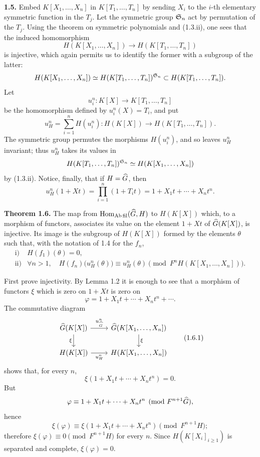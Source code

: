 \documentclass[11pt]{article}
\begin{document}
\textbf{1.5.} Embed \(K[X_1,\ldots,X_n]\) in \(K[T_1,\ldots,T_n]\) by sending \(X_i\) to the \(i\)-th elementary symmetric function in the \(T_j\). Let the symmetric group \(\mathfrak S_n\) act by permutation of the \(T_j\). Using the theorem on symmetric polynomials and (1.3.ii), one sees that the induced homomorphism
\[
  H(K[X_1,\ldots,X_n])\longrightarrow H(K[T_1,\ldots,T_n])
\]
is injective, which again permits us to identify the former with a subgroup of the latter:
\[
  H(K[X_1,\ldots,X_n])\simeq H(K[T_1,\ldots,T_n])^{\mathfrak S_n}
  \subset H(K[T_1,\ldots,T_n]).
\]
Let
\[
  u_i^n:K[X]\longrightarrow K[T_1,\ldots,T_n]
\]
be the homomorphism defined by \(u_i^n(X)=T_i\), and put
\[
  u_H^n=\sum_{i=1}^n H(u_i^n):H(K[X])\longrightarrow H(K[T_1,\ldots,T_n]).
\]
The symmetric group permutes the morphisms \(H(u_i^n)\), and so leaves \(u_H^n\) invariant; thus \(u_H^n\) takes its values in
\[
  H(K[T_1,\ldots,T_n])^{\mathfrak S_n}
   \simeq H(K[X_1,\ldots,X_n])
\]
by (1.3.ii). Notice, finally, that if \(H=\widehat G\), then
\[
  u_H^n(1+Xt)=\prod_{i=1}^n(1+T_it)=1+X_1t+\cdots+X_nt^n.
\]

\textbf{Theorem 1.6.} The map from \(\operatorname{Hom}_{\mathrm{Ab\,fil}}(\widehat G,H)\) to \(H(K[X])\) which, to a morphism of functors, associates its value on the element \(1+Xt\) of \(\widehat G(K[X])\), is injective. Its image is the subgroup of \(H(K[X])\) formed by the elements \(\theta\) such that, with the notation of 1.4 for the \(f_n\),
\[
\begin{array}{ll}
\text{i)}& H(f_1)(\theta)=0,\\[0.3em]
\text{ii)}& \forall n>1,\quad
 H(f_n)\bigl(u_H^n(\theta)\bigr)\equiv u_H^n(\theta)
 \pmod{F^nH(K[X_1,\ldots,X_n])}.
\end{array}
\]

First prove injectivity. By Lemma 1.2 it is enough to see that a morphism of functors \(\xi\) which is zero on \(1+Xt\) is zero on
\[
  \varphi=1+X_1t+\cdots+X_nt^n+\cdots .
\]
The commutative diagram
\[
\begin{tikzcd}
\Ghat(K[X]) \arrow[r,"u^n_{\Ghat}"] \arrow[d,"\xi"'] &
\Ghat(K[X_1,\ldots,X_n]) \arrow[d,"\xi"]\\
H(K[X]) \arrow[r,"u_H^n"'] &
H(K[X_1,\ldots,X_n])
\end{tikzcd}
\tag{1.6.1}
\]
shows that, for every \(n\),
\[
  \xi(1+X_1t+\cdots+X_nt^n)=0.
\]
But
\[
  \varphi\equiv 1+X_1t+\cdots+X_nt^n
  \pmod{F^{n+1}\widehat G},
\]
hence
\[
  \xi(\varphi)\equiv \xi(1+X_1t+\cdots+X_nt^n)
  \pmod{F^{n+1}H};
\]
therefore \(\xi(\varphi)\equiv 0\pmod{F^{n+1}H}\) for every \(n\). Since \(H(K[X_i]_{i\geq 1})\) is separated and complete, \(\xi(\varphi)=0\).
\end{document}
